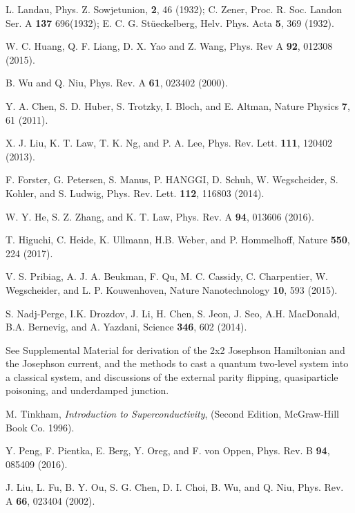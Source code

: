 \documentclass[aps,prl,twocolumn,showpacs,showpacs,10pt,superscriptaddress]{revtex4-1}
\begin{document}
\begin{thebibliography}{00}


 L. Landau, Phys. Z. Sowjetunion, \textbf{2}, 46 (1932); C. Zener, Proc. R. Soc. Landon Ser. A \textbf{137} 696(1932); E. C. G. St\"ueckelberg, Helv. Phys. Acta \textbf{5}, 369 (1932).


 W. C. Huang, Q. F. Liang, D. X. Yao and Z. Wang, Phys. Rev A \textbf{92}, 012308 (2015).

 B. Wu and Q. Niu, Phys. Rev. A \textbf{61}, 023402 (2000).

 Y. A. Chen, S. D. Huber, S. Trotzky, I. Bloch, and E. Altman, Nature Physics \textbf{7}, 61 (2011).

 X. J. Liu, K. T. Law, T. K. Ng, and P. A. Lee, Phys. Rev. Lett. \textbf{111}, 120402 (2013).

 F. Forster, G. Petersen, S. Manus, P. HANGGI, D. Schuh, W. Wegscheider, S. Kohler, and S. Ludwig, Phys. Rev. Lett. \textbf{112}, 116803 (2014).

 W. Y. He, S. Z. Zhang, and K. T. Law, Phys. Rev. A \textbf{94}, 013606 (2016).

 T. Higuchi, C. Heide, K. Ullmann, H.B. Weber, and P. Hommelhoff, Nature \textbf{550}, 224 (2017).

 V. S. Pribiag, A. J. A. Beukman, F. Qu, M. C. Cassidy, C. Charpentier, W. Wegscheider, and L. P. Kouwenhoven, Nature Nanotechnology \textbf{10}, 593 (2015).

 S. Nadj-Perge, I.K. Drozdov, J. Li, H. Chen, S. Jeon, J. Seo, A.H. MacDonald, B.A. Bernevig, and A. Yazdani, Science \textbf{346}, 602 (2014).

 See Supplemental Material for derivation of the 2x2 Josephson Hamiltonian and the Josephson current, and the methods to cast a quantum two-level system into a classical system, and discussions of the external parity flipping, quasiparticle poisoning, and underdamped junction.

  M. Tinkham, {\it Introduction to Superconductivity}, (Second Edition, McGraw-Hill Book Co. 1996).

 Y. Peng, F. Pientka, E. Berg, Y. Oreg, and F. von Oppen, Phys. Rev. B \textbf{94}, 085409 (2016).



 J. Liu, L. Fu, B. Y. Ou, S. G. Chen, D. I. Choi, B. Wu, and Q. Niu, Phys. Rev. A \textbf{66}, 023404 (2002).


\end{thebibliography}
\end{document}
